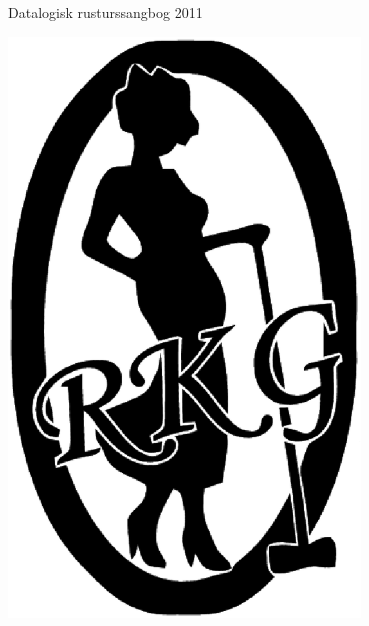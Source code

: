 
\begin{center}
{\LARGE Datalogisk rusturssangbog 2011}\\


\begin{center}
\includegraphics[width=0.7\textwidth]{logo.eps}
\end{center}


\end{center}


\newpage
